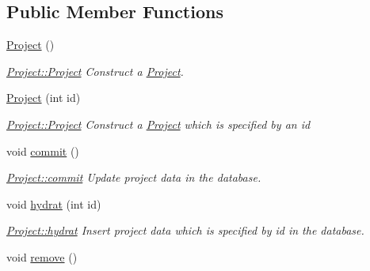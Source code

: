 \subsection*{Public Member Functions}
\begin{DoxyCompactItemize}
\item 
\hypertarget{classProject_aa007ecd17d5bc800e7a956cf666eea21}{\hyperlink{classProject_aa007ecd17d5bc800e7a956cf666eea21}{Project} ()}\label{classProject_aa007ecd17d5bc800e7a956cf666eea21}

\begin{DoxyCompactList}\small\item\em \hyperlink{classProject_aa007ecd17d5bc800e7a956cf666eea21}{Project\+::\+Project} Construct a \hyperlink{classProject}{Project}. \end{DoxyCompactList}\item 
\hyperlink{classProject_a8f608fdf1f0687598294f9534d702dd5}{Project} (int id)
\begin{DoxyCompactList}\small\item\em \hyperlink{classProject_aa007ecd17d5bc800e7a956cf666eea21}{Project\+::\+Project} Construct a \hyperlink{classProject}{Project} which is specified by an {\itshape id} \end{DoxyCompactList}\item 
\hypertarget{classProject_ab471d9354fb128c801f455e9a6bef675}{void \hyperlink{classProject_ab471d9354fb128c801f455e9a6bef675}{commit} ()}\label{classProject_ab471d9354fb128c801f455e9a6bef675}

\begin{DoxyCompactList}\small\item\em \hyperlink{classProject_ab471d9354fb128c801f455e9a6bef675}{Project\+::commit} Update project data in the database. \end{DoxyCompactList}\item 
void \hyperlink{classProject_aa966f15c9c8a277844a75c3530701525}{hydrat} (int id)
\begin{DoxyCompactList}\small\item\em \hyperlink{classProject_aa966f15c9c8a277844a75c3530701525}{Project\+::hydrat} Insert project data which is specified by {\itshape id} in the database. \end{DoxyCompactList}\item 
\hypertarget{classProject_a7bd735a59c2fdf2718db14c3073245fc}{void \hyperlink{classProject_a7bd735a59c2fdf2718db14c3073245fc}{remove} ()}\label{classProject_a7bd735a59c2fdf2718db14c3073245fc}


\end{DoxyCompactItemize}
